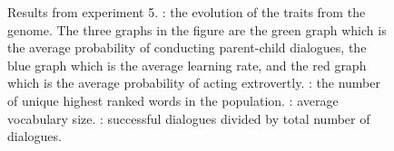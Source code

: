 \begin{figure}
    \centering
    \ContinuedFloat
    \hfill
    \par \bigskip
    \hfill
    \caption{Results from experiment 5. : the evolution of the traits from the genome. The three graphs in the figure are the green graph which is the average probability of conducting parent-child dialogues, the blue graph which is the average learning rate, and the  red graph which is the average probability of acting extrovertly. : the number of unique highest ranked words in the population. : average vocabulary size. : successful dialogues divided by total number of dialogues.}
    \label{fig:exp5.1}
\end{figure}

